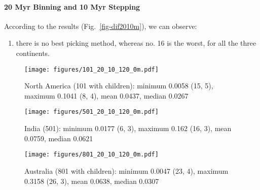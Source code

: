 \paragraph{20 Myr Binning and 10 Myr Stepping}

According to the results (Fig.~\ref{fig-dif2010m}), we can observe:
%
\begin{enumerate}
  \item there is no best picking method, whereas no. 16 is the worst, for all
		the three continents.
\end{enumerate}

\begin{figure*}
	\centering
	\begin{subfigure}{1.01\textwidth}
		\texttt{[image: figures/101\_20\_10\_120\_0m.pdf]}
		\caption{North America (101 with children): minimum 0.0058 (15, 5), maximum 0.1041 (8, 4), mean 0.0437, median 0.0267}\label{fig-nac-dif2010m}
	\end{subfigure}
	\vspace{1em}
	\begin{subfigure}{1.01\textwidth}
		\texttt{[image: figures/501\_20\_10\_120\_0m.pdf]}
		\caption{India (501): minimum 0.0177 (6, 3), maximum 0.162 (16, 3), mean 0.0759, median 0.0621}\label{fig-ind-dif2010m}
	\end{subfigure}
	\vspace{1em}
	\begin{subfigure}{1.01\textwidth}
		\texttt{[image: figures/801\_20\_10\_120\_0m.pdf]}
		\caption{Australia (801 with children): minimum 0.0047 (23, 4), maximum 0.3158 (26, 3), mean 0.0638, median 0.0307}\label{fig-au-dif2010m}
	\end{subfigure}
	\caption[Differences of each plate's paleomagnetic APWPs versus
its MHM predicted APWP]{Same as Fig.~\ref{fig-dif2010} except that the reference
path is predicted from MHM here. See the numbers of picked paleopoles in
Fig.~\ref{fig-dif}.}\label{fig-dif2010m}
\end{figure*}

